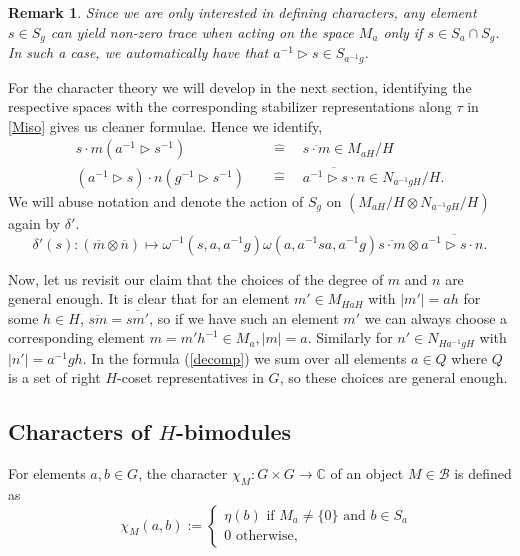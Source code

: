 \documentclass[a4paper, 10pt]{book}
\newtheorem{Rem}[theorem]{Remark}
\theoremstyle{definition}
\numberwithin{equation}{chapter}
\newcommand\identify{\quad\hat{=}\quad}
\newcommand\hit{\triangleright}
\newcommand\inv{^{-1}}
\newcommand\ot{\otimes}
\newcommand\kk{\mathbb C}
\newcommand\B{\mathcal B}
\newcommand{\ra}\rightarrow
\begin{document}
\fi
\begin{Rem}\label{stabset}\rm
Since we are only interested in defining characters, any element $s\in S_g$ can yield non-zero trace when acting on the space $M_a$ only if $s\in S_a\cap S_g$. In such a case, we automatically have that $a\inv\hit s\in S_{a\inv g}$. 
\end{Rem}
For the character theory we will develop in the next section, identifying the respective spaces with the corresponding stabilizer representations along $\tau$ in \eqref{Miso} gives us cleaner formulae. Hence we identify, \begin{align}
	s\cdot m (a\inv\hit s\inv)  &\identify \overline{s\cdot m} \in M_{aH}/H\\
	(a\inv\hit s)\cdot n(g\inv \hit s\inv) &\identify \overline{a\inv \hit s\cdot n} \in N_{a\inv g H} /H.
\end{align}
We will abuse notation and denote the action of $S_g$ on $(M_{aH}/H \ot N_{a\inv gH}/H)$ again by $\delta'$. \begin{equation}
	\delta'(s): (\overline{m}\otimes \overline{n})\mapsto \omega\inv (s, a, a\inv g)\omega (a, a\inv sa, a\inv g)\overline{s\cdot m} \otimes \overline{a\inv \hit s\cdot n.} \label{mainaction}
\end{equation}

Now, let us revisit our claim that the choices of the degree of $m$ and $n$ are general enough. It is clear that for an element $m'\in M_{HaH}$ with $|m'| = ah$ for some $h\in H$, $\overline{sm} = \overline{sm'}$, so if we have such an element $m'$ we can always choose a corresponding element $m=m'h\inv \in M_a, |m| = a$. Similarly for $n' \in N_{Ha\inv g H}$ with $|n'| = a\inv gh$. In the formula (\ref{decomp}) we sum over all elements $a\in Q$ where $Q$ is a set of right $H$-coset representatives in $G$, so these choices are general enough.

\subsection{Characters of $H$-bimodules}
For elements $a, b \in G$, the character $\chi_M:G\times G \ra \kk$ of an object $M\in \B$ is defined as 
 \begin{equation}
\quad\chi_{M}(a,b) := \begin{cases}
\eta(b) \text{ if } M_a\neq \{0\} \text{ and }b\in S_a\\
0\text{ otherwise,}
\end{cases}\label{bimodulechar}
\end{equation} 
\end{document}
